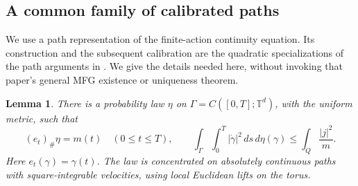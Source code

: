 \documentclass[11pt]{article}
\newcommand{\T}{\mathbb T}
\numberwithin{equation}{section}
\newtheorem{lemma}[theorem]{Lemma}
\begin{document}
\subsection{A common family of calibrated paths}

We use a path representation of the finite-action continuity equation.
Its construction and the subsequent calibration are the quadratic
specializations of the path arguments in \cite[Section~4.3]{Cardaliaguet}.
We give the details needed here, without invoking that paper's general
MFG existence or uniqueness theorem.

\begin{lemma}\label{lem:paths}
There is a probability law \(\eta\) on
\(\Gamma=C([0,T];\T^d)\), with the uniform metric, such that
\begin{equation}\label{eq:path-law}
 (e_t)_\#\eta=m(t)\quad(0\le t\le T),\qquad
 \int_\Gamma\int_0^T|\dot\gamma|^2\,ds\,d\eta(\gamma)
           \le\int_Q\frac{|j|^2}{m}.
\end{equation}
Here \(e_t(\gamma)=\gamma(t)\). The law is concentrated on absolutely
continuous paths with square-integrable velocities, using local
Euclidean lifts on the torus.
\end{lemma}
\end{document}
